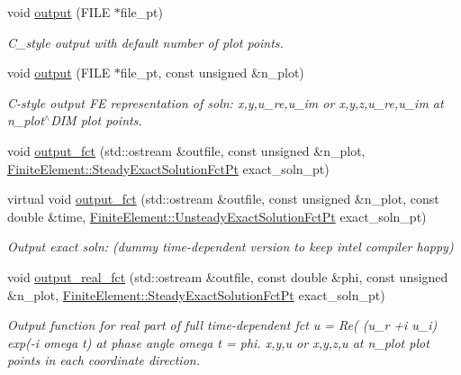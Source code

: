 \begin{DoxyCompactItemize}
void \hyperlink{classoomph_1_1HelmholtzEquations_a4ff9181e482ccaf3ae94b452e0efa9a1}{output} (F\+I\+LE $\ast$file\+\_\+pt)
\begin{DoxyCompactList}\small\item\em C\+\_\+style output with default number of plot points. \end{DoxyCompactList}\item 
void \hyperlink{classoomph_1_1HelmholtzEquations_a0ba883cd70dbbd5664e76b83407f1144}{output} (F\+I\+LE $\ast$file\+\_\+pt, const unsigned \&n\+\_\+plot)
\begin{DoxyCompactList}\small\item\em C-\/style output FE representation of soln\+: x,y,u\+\_\+re,u\+\_\+im or x,y,z,u\+\_\+re,u\+\_\+im at n\+\_\+plot$^\wedge$\+D\+IM plot points. \end{DoxyCompactList}\item 
void \hyperlink{classoomph_1_1HelmholtzEquations_a18bda8e96ef3abc2d247018592f15f56}{output\+\_\+fct} (std\+::ostream \&outfile, const unsigned \&n\+\_\+plot, \hyperlink{classoomph_1_1FiniteElement_a690fd33af26cc3e84f39bba6d5a85202}{Finite\+Element\+::\+Steady\+Exact\+Solution\+Fct\+Pt} exact\+\_\+soln\+\_\+pt)
\item 
virtual void \hyperlink{classoomph_1_1HelmholtzEquations_abf09295bc42ac5e63b83b3162b94c949}{output\+\_\+fct} (std\+::ostream \&outfile, const unsigned \&n\+\_\+plot, const double \&time, \hyperlink{classoomph_1_1FiniteElement_ad4ecf2b61b158a4b4d351a60d23c633e}{Finite\+Element\+::\+Unsteady\+Exact\+Solution\+Fct\+Pt} exact\+\_\+soln\+\_\+pt)
\begin{DoxyCompactList}\small\item\em Output exact soln\+: (dummy time-\/dependent version to keep intel compiler happy) \end{DoxyCompactList}\item 
void \hyperlink{classoomph_1_1HelmholtzEquations_a9a9a358cf0e1e628b998353252cf99b4}{output\+\_\+real\+\_\+fct} (std\+::ostream \&outfile, const double \&phi, const unsigned \&n\+\_\+plot, \hyperlink{classoomph_1_1FiniteElement_a690fd33af26cc3e84f39bba6d5a85202}{Finite\+Element\+::\+Steady\+Exact\+Solution\+Fct\+Pt} exact\+\_\+soln\+\_\+pt)
\begin{DoxyCompactList}\small\item\em Output function for real part of full time-\/dependent fct u = Re( (u\+\_\+r +i u\+\_\+i) exp(-\/i omega t) at phase angle omega t = phi. x,y,u or x,y,z,u at n\+\_\+plot plot points in each coordinate direction. \end{DoxyCompactList}\item 

\end{DoxyCompactItemize}
